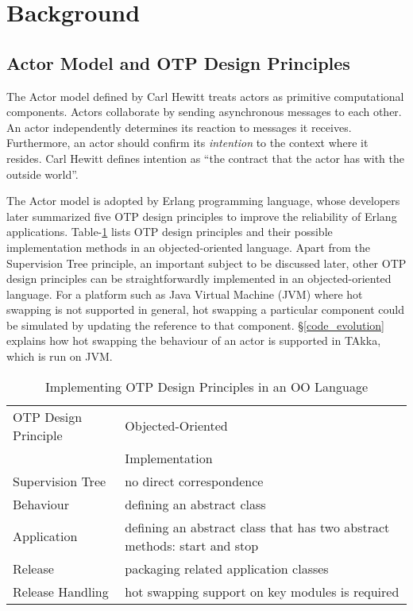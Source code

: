 \section{Background}
\label{background}



\subsection{Actor Model and OTP Design Principles}

The Actor model defined by Carl Hewitt treats actors as primitive computational
components.  Actors collaborate by sending asynchronous messages to each other.
An actor independently determines its reaction to messages it receives.
Furthermore, an actor should confirm its {\it intention} to the context where
it resides.  Carl Hewitt defines intention as ``the contract that the actor
has with the outside world''.\cite{Hewitt:1973}


The Actor model is adopted by Erlang programming language, whose developers
later summarized five OTP design principles to improve the reliability of Erlang
applications\cite{OTP}.  Table-\ref{otp} lists OTP design principles and their
possible implementation methods in an objected-oriented language.  Apart from
the Supervision Tree principle,  an important subject to be discussed later,
other OTP design principles can be straightforwardly implemented in an
objected-oriented language.  For a platform such as Java Virtual Machine (JVM)
where hot swapping is not supported in general, hot swapping a particular
component could be simulated by updating the reference to that component.
\S\ref{code_evolution} explains how hot swapping the behaviour of an actor is
supported in TAkka, which is run on JVM.



\begin{table}[h]
\label{otp}
 \caption{Implementing OTP Design Principles in an OO Language}
 \begin{center}
\begin{tabular}{| l | p{7.8cm} | }
\hline
  OTP Design Principle & Objected-Oriented\\
                       & Implementation \\
\hline
  Supervision Tree  & no direct correspondence  \\
\hline
  Behaviour & defining an abstract class \\
\hline
  Application  & defining an abstract class that has two abstract methods: start and stop \\
\hline
  Release  & packaging related application classes  \\ 
\hline
  Release Handling  & hot swapping support on key modules is required \\
\hline
\end{tabular}
 \end{center}
\end{table}


